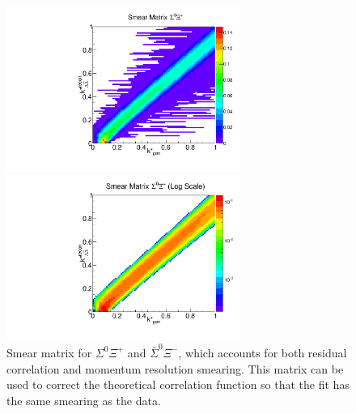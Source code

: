 \begin{figure}[h]
\begin{minipage}{18pc}
\includegraphics[width=18pc]{Figures/SmearMatrices/2016-7-19-SmearMatrixSigmaXiCNormLA.pdf}
\end{minipage}\hspace{2pc}
\begin{minipage}{18pc}
\includegraphics[width=18pc]{Figures/SmearMatrices/2016-7-19-SmearMatrixSigmaXiCNormLALog.pdf}
\end{minipage} 
\caption[Smear matrix -- $\Sigma^0\Xi^{+}$ and $\bar{\Sigma}^0\Xi^{-}$]{
Smear matrix for $\Sigma^0\Xi^{+}$ and $\bar{\Sigma}^0\Xi^{-}$, which accounts for both residual correlation and momentum resolution smearing. This matrix can be used to correct the theoretical correlation function so that the fit has the same smearing as the data.
}
\end{figure}

